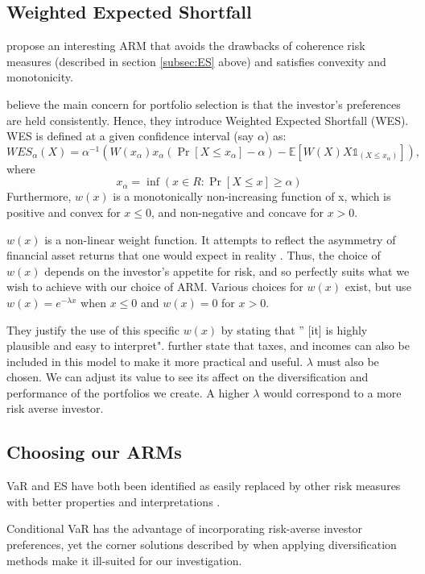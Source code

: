 \documentclass[12pt,a4paper]{article}
\newcommand{\e}[1]{{\mathbb E}\left[ #1 \right]}
\begin{document}
\subsection{Weighted Expected Shortfall}
\label{subsec:WES}

\cite{CHEN20111777} propose an interesting ARM that avoids the drawbacks of coherence risk measures (described in section \ref{subsec:ES} above) and satisfies convexity and monotonicity.

\cite{CHEN20111777} believe the main concern for portfolio selection is that the investor's preferences are held consistently. Hence, they introduce Weighted Expected Shortfall (WES). WES is defined at a given confidence interval (say $\alpha$) as:
$$
WES_{\alpha}(X)= \alpha^{-1}(W(x_{\alpha})x_{\alpha}(\Pr[X \leq x_{\alpha}]-\alpha)-\e{W(X)X\mathbb{1}_{(X \leq x_{\alpha})}}),
$$ 
where 
$$ x_{\alpha} = \inf( {x \in R : \Pr[X \leq x] \geq \alpha })$$
Furthermore, $w(x)$ is a monotonically non-increasing function of x, which is positive and convex for $x \leq 0 $, and non-negative and concave for $x>0 $.

$w(x)$ is a non-linear weight function. It attempts to reflect the asymmetry of financial asset returns that one would expect in reality \citep{CHEN20111777}. Thus, the choice of $w(x)$ depends on the investor's appetite for risk, and so perfectly suits what we wish to achieve with our choice of ARM. Various choices for $w(x)$ exist, but \cite{CHEN20111777} use $w(x)= e^{-\lambda x}$ when $x \leq 0$ and $w(x) = 0$ for $x > 0$. 

They justify the use of this specific $w(x)$ by stating that '' [it] is highly plausible and easy to interpret". \cite{CHEN20111777} further state that taxes, and incomes can also be included in this model to make it more practical and useful. $\lambda$ must also be chosen. We can adjust its value to see its affect on the diversification and performance of the portfolios we create. A  higher $\lambda$ would correspond to a more risk averse investor\citep{CHEN20111777}.

\subsection{Choosing our ARMs}
\label{subsec:ARMchoices}

VaR and ES have both been identified as easily replaced by other risk measures with better properties and interpretations \citep{dowd2006after}.

Conditional VaR has the advantage of incorporating risk-averse investor preferences, yet the corner solutions described by \cite{BRANDTNER20135526} when applying diversification methods make it ill-suited for our investigation.
\end{document}
